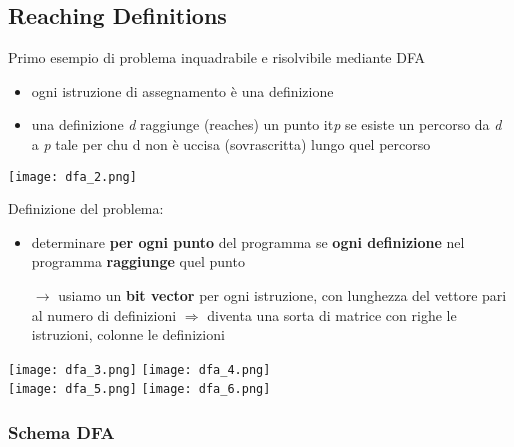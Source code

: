 \subsection{Reaching Definitions}

\noindent \begin{minipage}[c]{.6\textwidth}
  Primo esempio di problema inquadrabile e risolvibile mediante DFA
  \begin{itemize}
    \item ogni istruzione di assegnamento \`e una definizione
    \item una definizione \textit{d} raggiunge (reaches) un punto it\textit{p} se esiste un percorso da \textit{d} a \textit{p} tale per chu d non \`e uccisa (sovrascritta) lungo quel percorso
  \end{itemize}
\end{minipage}
\hfill
\begin{minipage}[c]{.3\textwidth}
  \texttt{[image: dfa\_2.png]}
\end{minipage}

Definizione del problema:
\begin{itemize}
  \item determinare \textbf{per ogni punto} del programma se \textbf{ogni definizione} nel programma \textbf{raggiunge} quel punto
  \item[$\rightarrow$] usiamo un \textbf{bit vector} per ogni istruzione, con lunghezza del vettore pari al numero di definizioni $\Rightarrow$ diventa una sorta di matrice con righe le istruzioni, colonne le definizioni
\end{itemize}

\begin{example}
  \centering
  \texttt{[image: dfa\_3.png]}\hfill
  \texttt{[image: dfa\_4.png]}\\
  \texttt{[image: dfa\_5.png]}\hfill
  \texttt{[image: dfa\_6.png]}
\end{example}


\subsubsection{Schema DFA}

